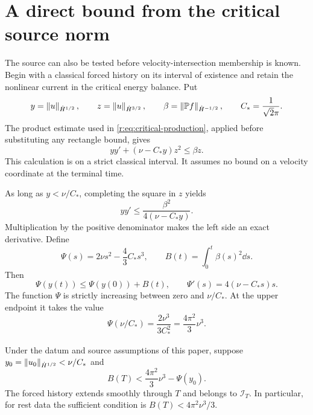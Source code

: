 \section{A direct bound from the critical source norm}
\label{r:app:critical-source}

The source can also be tested before velocity-intersection membership is
known. Begin with a classical forced history on its interval of existence
and retain the nonlinear current in the critical energy balance. Put
\[
 y=\left\lVert u\right\rVert_{\dot H^{1/2}},\qquad
 z=\left\lVert u\right\rVert_{\dot H^{3/2}},\qquad
 \beta=\left\lVert \mathbb P f\right\rVert_{\dot H^{-1/2}},\qquad
 C_*=\frac1{\sqrt2\pi}.
\]
The product estimate used in \eqref{r:eq:critical-production}, applied
before substituting any rectangle bound, gives
\begin{equation}
 y y'+(\nu-C_*y)z^2\le\beta z.
 \label{r:eq:critical-source-energy}
\end{equation}
This calculation is on a strict classical interval. It assumes no bound
on a velocity coordinate at the terminal time.

As long as \(y<\nu/C_*\), completing the square in \(z\) yields
\[
 y y'\le\frac{\beta^2}{4(\nu-C_*y)}.
\]
Multiplication by the positive denominator makes the left side an exact
derivative. Define
\[
 \Psi(s)=2\nu s^2-\frac43C_*s^3,\qquad
 B(t)=\int_0^t\beta(s)^2\dd s.
\]
Then
\begin{equation}
 \Psi(y(t))\le\Psi(y(0))+B(t),\qquad
 \Psi'(s)=4(\nu-C_*s)s.
 \label{r:eq:critical-source-primitive}
\end{equation}
The function \(\Psi\) is strictly increasing between zero and
\(\nu/C_*\). At the upper endpoint it takes the value
\[
 \Psi(\nu/C_*)=\frac{2\nu^3}{3C_*^2}
 =\frac{4\pi^2}{3}\nu^3.
\]

\begin{theorem}\label{r:thm:critical-source}
Under the datum and source assumptions of this paper, suppose
\(y_0=\left\lVert u_0\right\rVert_{\dot H^{1/2}}<\nu/C_*\) and
\begin{equation}
 B(T)<\frac{4\pi^2}{3}\nu^3-\Psi(y_0).
 \label{r:eq:critical-source-condition}
\end{equation}
The forced history extends smoothly through \(T\) and belongs to
\(\mathscr I_T\). In particular, for rest data the sufficient condition is
\(B(T)<4\pi^2\nu^3/3\).
\end{theorem}

